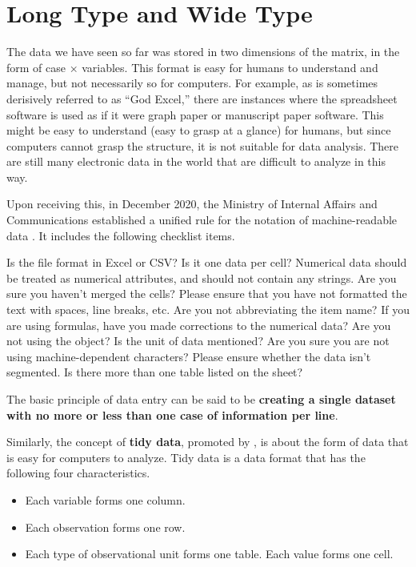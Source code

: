 \documentclass[
  a4paper,
]{book}
\providecommand{\tightlist}{%
  \setlength{\itemsep}{0pt}\setlength{\parskip}{0pt}}\usepackage{longtable,booktabs,array}
\begin{document}
\section{Long Type and Wide Type}\label{long-type-and-wide-type}

The data we have seen so far was stored in two dimensions of the matrix,
in the form of case × variables. This format is easy for humans to
understand and manage, but not necessarily so for computers. For
example, as is sometimes derisively referred to as ``God Excel,'' there
are instances where the spreadsheet software is used as if it were graph
paper or manuscript paper software. This might be easy to understand
(easy to grasp at a glance) for humans, but since computers cannot grasp
the structure, it is not suitable for data analysis. There are still
many electronic data in the world that are difficult to analyze in this
way.

Upon receiving this, in December 2020, the Ministry of Internal Affairs
and Communications established a unified rule for the notation of
machine-readable data \autocite{soumu}. It includes the following
checklist items.

Is the file format in Excel or CSV? Is it one data per cell? Numerical
data should be treated as numerical attributes, and should not contain
any strings. Are you sure you haven't merged the cells? Please ensure
that you have not formatted the text with spaces, line breaks, etc. Are
you not abbreviating the item name? If you are using formulas, have you
made corrections to the numerical data? Are you not using the object? Is
the unit of data mentioned? Are you sure you are not using
machine-dependent characters? Please ensure whether the data isn't
segmented. Is there more than one table listed on the sheet?

The basic principle of data entry can be said to be \textbf{creating a
single dataset with no more or less than one case of information per
line}.

Similarly, the concept of \textbf{tidy data}, promoted by
\textcite{Hadley2014}, is about the form of data that is easy for
computers to analyze. Tidy data is a data format that has the following
four characteristics.

\begin{itemize}
\tightlist
\item
  Each variable forms one column.
\item
  Each observation forms one row.
\item
  Each type of observational unit forms one table. Each value forms one
  cell.
\end{itemize}
\end{document}
